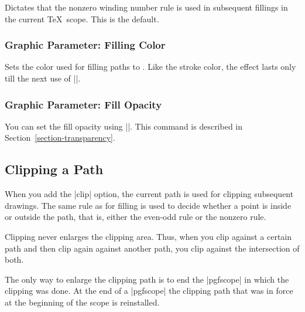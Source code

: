 \begin{command}{\pgfsetnonzerorule}
  Dictates that the nonzero winding number rule is used in subsequent
  fillings in the current \TeX\ scope. This is the default.

\begin{codeexample}[]
\begin{pgfpicture}
  \pgfsetnonzerorule
  \pgfpathcircle{\pgfpoint{0mm}{0cm}}{7mm}
  \pgfpathcircle{\pgfpoint{5mm}{0cm}}{7mm}
\end{pgfpicture}
\end{codeexample}
\end{command}

\subsubsection{Graphic Parameter: Filling Color}

\begin{command}{\pgfsetfillcolor{}}
  Sets the color used for filling paths to . Like the
  stroke color, the effect lasts only till the next use of |\color|.
\end{command}


\subsubsection{Graphic Parameter: Fill Opacity}

You can set the fill opacity using |\pgfsetfillopacity|. This
command is described in Section~\ref{section-transparency}.

\subsection{Clipping a Path}
\label{section-clip}

When you add the |clip| option, the current path is used for
clipping subsequent drawings. The same rule as for filling is used to
decide whether a point is inside or outside the path, that is, either
the even-odd rule or the nonzero rule.

Clipping never enlarges the clipping area. Thus, when you clip against
a certain path and then clip again against another path, you clip
against the intersection of both.

The only way to enlarge the clipping path is to end the |{pgfscope}|
in which the clipping was done. At the end of a |{pgfscope}| the
clipping path that was in force at the beginning of the scope is
reinstalled.

